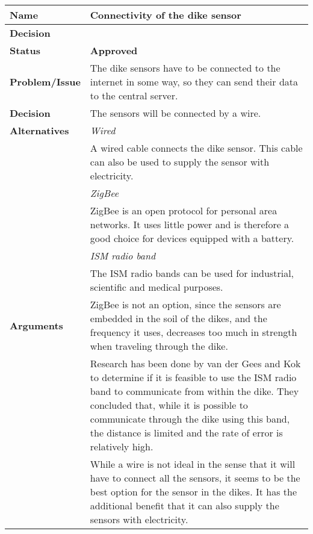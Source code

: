 \begin{table}[H]
	\begin{tabular}{L{0.2\textwidth} L{0.6\textwidth}}
		\textbf{Name}           & \textbf{Connectivity of the dike sensor} \\ \toprule
		\textbf{Decision}       & \textbf{}\\ \midrule
		\textbf{Status}         & \textbf{Approved} \\ \midrule
		\textbf{Problem/Issue}  & The dike sensors have to be connected to the internet in some way, so they can send their data to the central server. \\ \midrule
		\textbf{Decision}       & The sensors will be connected by a wire.\\ \midrule
		\textbf{Alternatives}   & \textit{Wired}\\
		& A wired cable connects the dike sensor. This cable can also be used to supply the sensor with electricity. \\
		& \textit{ZigBee}\\
		& ZigBee is an open protocol for personal area networks. It uses little power and is therefore a good choice for devices equipped with a battery. \\
		& \textit{ISM radio band} \\
		& The ISM radio bands can be used for industrial, scientific and medical purposes.  \\
		\midrule
		\textbf{Arguments}      & ZigBee is not an option, since the sensors are embedded in the soil of the dikes, and the frequency it uses, decreases too much in strength when traveling through the dike\cite{van2009draadloos}. \\
		& Research has been done by van der Gees and Kok \cite{van2009draadloos} to determine if it is feasible to use the ISM radio band to communicate from within the dike. They concluded that, while it is possible to communicate through the dike using this band, the distance is limited and the rate of error is relatively high.
		\\
		& While a wire is not ideal in the sense that it will have to connect all the sensors, it seems to be the best option for the sensor in the dikes. It has the additional benefit that it can also supply the sensors with electricity.
						                            

\end{tabular}
\end{table}
